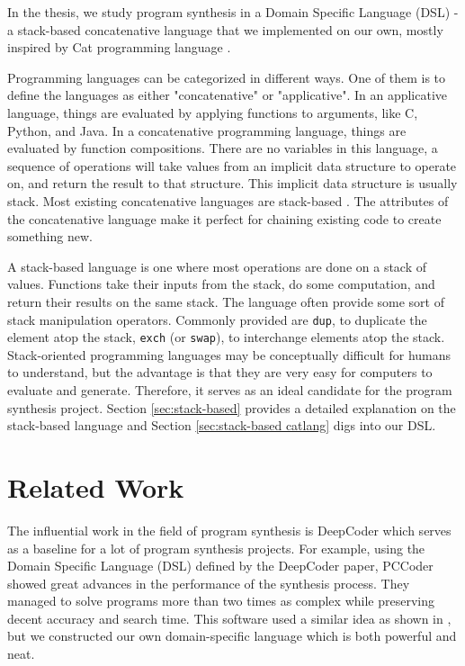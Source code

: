 In the thesis, we study program synthesis in a Domain Specific Language (DSL) - a stack-based concatenative language that we implemented on our own, mostly inspired by Cat programming language \cite{cat}. 

Programming languages can be categorized in different ways. One of them is to define the languages as either "concatenative" or "applicative". \cite{concat} In an applicative language, things are evaluated by applying functions to arguments, like C, Python, and Java. In a concatenative programming language, things are evaluated by function compositions. There are no variables in this language, a sequence of operations will take values from an implicit data structure to operate on, and return the result to that structure. This implicit data structure is usually stack. Most existing concatenative languages are stack-based \cite{wiki:concat}. The attributes of the concatenative language make it perfect for chaining existing code to create something new.

A stack-based language is one where most operations are done on a stack of values. Functions take their inputs from the stack, do some computation, and return their results on the same stack. The language often provide some sort of stack manipulation operators. Commonly provided are \texttt{dup}, to duplicate the element atop the stack, \texttt{exch} (or \texttt{swap}), to interchange elements atop the stack. Stack-oriented programming languages may be conceptually difficult for humans to understand, but the advantage is that they are very easy for computers to evaluate and generate. Therefore, it serves as an ideal candidate for the program synthesis project. Section \ref{sec:stack-based} provides a detailed explanation on the stack-based language and Section \ref{sec:stack-based catlang} digs into our DSL. 

\section{Related Work}
The influential work in the field of program synthesis is DeepCoder \cite{deepc} which serves as a baseline for a lot of program synthesis projects. For example, using the Domain Specific Language (DSL) defined by the DeepCoder paper, PCCoder \cite{pcc} showed great advances in the performance of the synthesis process. They managed to solve programs more than two times as complex while preserving decent accuracy and search time. This software used a similar idea as shown in \cite{deepc}, but we constructed our own domain-specific language which is both powerful and neat.

